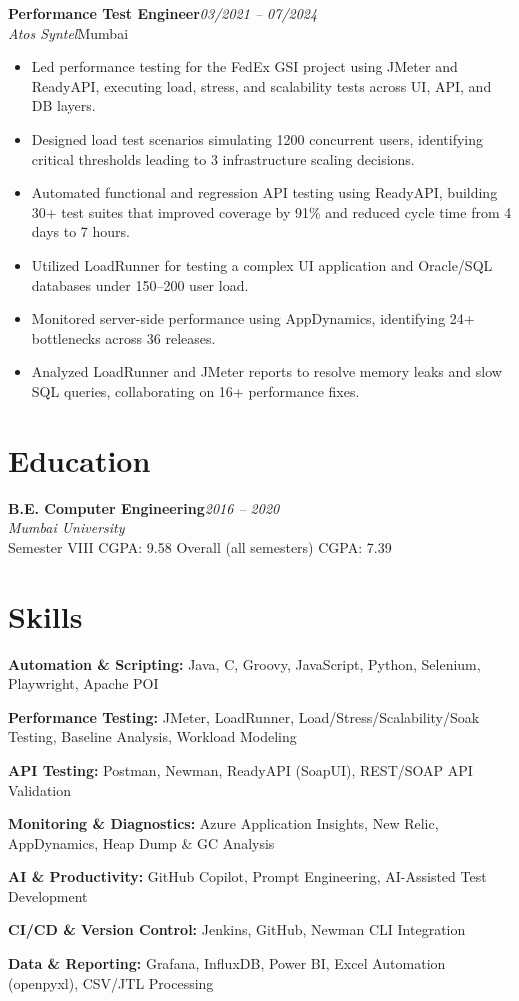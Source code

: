 \documentclass[11pt,a4paper]{article}
\newcommand{\jobheader}[4]{%
  \noindent\textbf{#1}\hfill\textit{#3}\\
  \textit{#2}\hfill{#4}\\[2pt]
}
\newenvironment{tightitemize}{%
  \begin{itemize}[leftmargin=1.3em, itemsep=3pt, topsep=4pt, parsep=0pt]
}{%
  \end{itemize}
  \vspace{4pt}
}
\begin{document}
\jobheader{Performance Test Engineer}{Atos Syntel}{03/2021 -- 07/2024}{Mumbai}
\begin{tightitemize}
  \item Led performance testing for the FedEx GSI project using JMeter and ReadyAPI, executing load, stress, and
    scalability tests across UI, API, and DB layers.
  \item Designed load test scenarios simulating 1200 concurrent users, identifying critical thresholds leading to
    3 infrastructure scaling decisions.
  \item Automated functional and regression API testing using ReadyAPI, building 30+ test suites that improved
    coverage by 91\% and reduced cycle time from 4 days to 7 hours.
  \item Utilized LoadRunner for testing a complex UI application and Oracle/SQL databases under 150--200 user load.
  \item Monitored server-side performance using AppDynamics, identifying 24+ bottlenecks across 36 releases.
  \item Analyzed LoadRunner and JMeter reports to resolve memory leaks and slow SQL queries, collaborating on
    16+ performance fixes.
\end{tightitemize}

\section*{Education}

\jobheader{B.E. Computer Engineering}{Mumbai University}{2016 -- 2020}{}
Semester VIII CGPA: 9.58 \quad\textbullet\quad Overall (all semesters) CGPA: 7.39

\section*{Skills}

\textbf{Automation \& Scripting:} Java, C, Groovy, JavaScript, Python, Selenium, Playwright, Apache POI

\medskip
\textbf{Performance Testing:} JMeter, LoadRunner, Load/Stress/Scalability/Soak Testing, Baseline Analysis,
Workload Modeling

\medskip
\textbf{API Testing:} Postman, Newman, ReadyAPI (SoapUI), REST/SOAP API Validation

\medskip
\textbf{Monitoring \& Diagnostics:} Azure Application Insights, New Relic, AppDynamics, Heap Dump \& GC Analysis

\medskip
\textbf{AI \& Productivity:} GitHub Copilot, Prompt Engineering, AI-Assisted Test Development

\medskip
\textbf{CI/CD \& Version Control:} Jenkins, GitHub, Newman CLI Integration

\medskip
\textbf{Data \& Reporting:} Grafana, InfluxDB, Power BI, Excel Automation (openpyxl), CSV/JTL Processing
\end{document}
